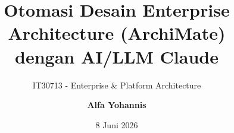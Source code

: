 \documentclass[aspectratio=169, table]{beamer}
\title{\LARGE Otomasi Desain Enterprise\\
  Architecture (ArchiMate)\\
  dengan AI/LLM Claude}
\subtitle{IT30713 - Enterprise \& Platform Architecture}
\author{\textbf{Alfa Yohannis}}
\date{8 Juni 2026}
\begin{document}
\frame{\titlepage}
\end{document}
